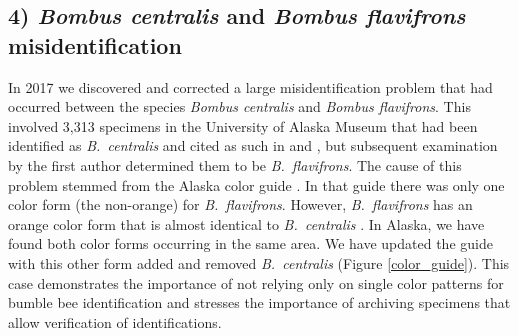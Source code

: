 \begin{multicols}{2}

\subsection{4) \textit{Bombus centralis} and \textit{Bombus flavifrons} misidentification}

In 2017 we discovered and corrected a large misidentification problem that had occurred between the species \textit{Bombus centralis} and \textit{Bombus flavifrons}. This involved 3,313 specimens in the University of Alaska Museum that had been identified as \textit{B.\ centralis} and cited as such in \citet{Pampell2010} and \citet{Pampelletal2015}, but subsequent examination by the first author determined them to be \textit{B.\ flavifrons}. The cause of this problem stemmed from the Alaska color guide \citep{Pampell2013}. In that guide there was only one color form (the non-orange) for \textit{B.\ flavifrons}. However, \textit{B.\ flavifrons} has an orange color form that is almost identical to \textit{B.\ centralis} \citep{Williamsetal2014}. In Alaska, we have found both color forms occurring in the same area. We have updated the guide with this other form added and removed \textit{B.\ centralis} (Figure \ref{color_guide}). This case demonstrates the importance of not relying only on single color patterns for bumble bee identification and stresses the importance of archiving specimens that allow verification of identifications.


\end{multicols}
